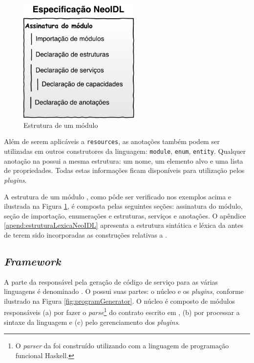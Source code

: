 \begin{figure}[htb]
\begin{center}
\includegraphics[width=60mm,trim=0cm 0cm 0cm
0cm]{img/NeoIDLModuleSpecificationPt.pdf}
\end{center}
\caption{Estrutura de um módulo \neoidl{}}
\label{fig:moduloNeoIDL}
\end{figure}

Além de serem aplicáveis a \texttt{resources}, as anotações também podem ser
utilizadas em outros construtores da linguagem: \texttt{module},
\texttt{enum}, \texttt{entity}. Qualquer anotação na \neoidl{} possui a mesma estrutura: um
nome, um elemento alvo e uma lista de propriedades. Todas estas informações
ficam disponíveis para utilização pelos \textit{plugins}.


A estrutura de um módulo \neoidl{}, como pôde ser verificado nos exemplos
acima e ilustrada na Figura \ref{fig:moduloNeoIDL}, é composta pelas seguintes
seções: assinatura do módulo, seção de importação, enumerações e estruturas,
serviços e anotações. O apêndice \ref{apend:estruturaLexicaNeoIDL} apresenta a
estrutura sintática e léxica da \neoidl{} antes de terem sido incorporadas as construções
relativas a \designbycontract{}.



\subsection{\textit{Framework}}
\label{frameNeoIDL}
\vspace{-6mm}

A parte da \neoidl{} responsável pela geração de código de
serviço para as várias linguagens é denominado \framework{} \neoidl{}. O
\framework{} \neoidl{} possui suas partes: o núcleo e os \textit{plugins},
conforme ilustrado na Figura \ref{fig:programGenerator}.
O núcleo é composto de módulos responsáveis (a) por fazer o \textit{parse}\footnote{O \textit{parser} da \neoidl{}
foi construído utilizando \bnfc{} \cite{ranta-bnfc:2012} com a linguagem de
programação funcional Haskell.}
do contrato escrito em \neoidl{}, (b) por processar a sintaxe da linguagem \neoidl{} e (c) pelo gerenciamento dos \textit{plugins}.


